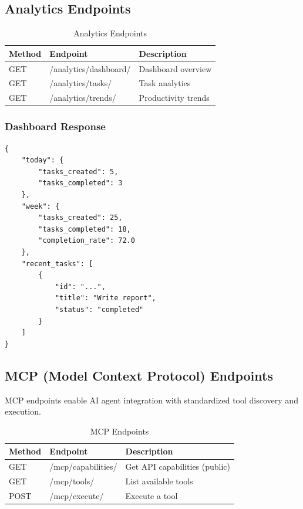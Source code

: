 \documentclass[11pt,a4paper]{article}
\begin{document}
\subsection{Analytics Endpoints}

\begin{table}[H]
\centering
\small
\begin{tabular}{@{}llp{6cm}@{}}
\toprule
\textbf{Method} & \textbf{Endpoint} & \textbf{Description} \\
\midrule
GET & /analytics/dashboard/ & Dashboard overview \\
GET & /analytics/tasks/ & Task analytics \\
GET & /analytics/trends/ & Productivity trends \\
\bottomrule
\end{tabular}
\caption{Analytics Endpoints}
\end{table}

\subsubsection{Dashboard Response}

\begin{lstlisting}[style=json]
{
    "today": {
        "tasks_created": 5,
        "tasks_completed": 3
    },
    "week": {
        "tasks_created": 25,
        "tasks_completed": 18,
        "completion_rate": 72.0
    },
    "recent_tasks": [
        {
            "id": "...",
            "title": "Write report",
            "status": "completed"
        }
    ]
}
\end{lstlisting}

\subsection{MCP (Model Context Protocol) Endpoints}

MCP endpoints enable AI agent integration with standardized tool discovery and execution.

\begin{table}[H]
\centering
\small
\begin{tabular}{@{}llp{6cm}@{}}
\toprule
\textbf{Method} & \textbf{Endpoint} & \textbf{Description} \\
\midrule
GET & /mcp/capabilities/ & Get API capabilities (public) \\
GET & /mcp/tools/ & List available tools \\
POST & /mcp/execute/ & Execute a tool \\
\bottomrule
\end{tabular}
\caption{MCP Endpoints}
\end{table}
\end{document}
